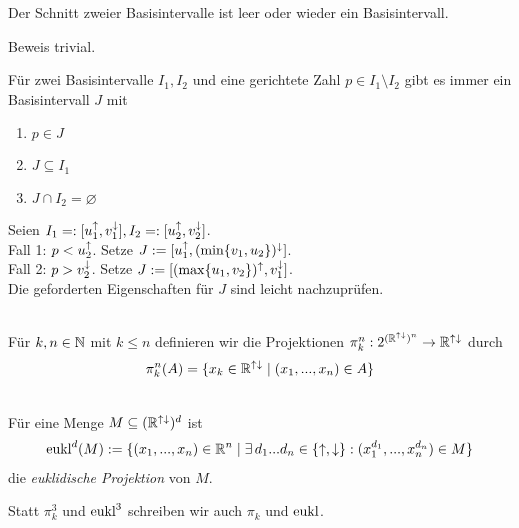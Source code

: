 \begin{satz}
    Der Schnitt zweier Basisintervalle ist leer oder wieder ein Basisintervall.
\end{satz}
Beweis trivial.

\begin{satz}\label{satz:strong-sup-1}
    Für zwei Basisintervalle $I_1, I_2$ und eine gerichtete Zahl $p \in I_1 \setminus I_2$ gibt es immer ein Basisintervall $J$ mit
    \begin{enumerate}
        \item $p \in J$
        \item $J \subseteq I_1$
        \item $J \cap I_2 = \varnothing$
    \end{enumerate}
\end{satz}

\begin{bew}
    Seien $I_1 =: [u_1^{\uparrow}, v_1^{\downarrow}], I_2 =: [u_2^{\uparrow}, v_2^{\downarrow}]$.\\
    Fall 1: $p < u_2^{\uparrow}$. Setze $J := [u_1^{\uparrow} , (\min\{v_1,u_2\})^{\downarrow}]$.\\
    Fall 2: $p > v_2^{\downarrow}$. Setze $J := [(\max\{u_1,v_2\})^{\uparrow}, v_1^{\downarrow}]$.\\
    Die geforderten Eigenschaften für $J$ sind leicht nachzuprüfen.
\end{bew}

\begin{dfn}[Projektionen]\ \\
    Für $k,n \in \mathbb{N}$ mit $k \leq n$ definieren wir die Projektionen $\pi_k^n : 2^{(\mathbb{R}^{{\uparrow \downarrow}})^n} \to \mathbb{R}^{{\uparrow \downarrow}}$ durch
    \begin{align*}
        \pi_k^n (A) = \{x_k \in \mathbb{R}^{{\uparrow \downarrow}} \mid (x_1, ..., x_n) \in A\}
    \end{align*}
\end{dfn}

\begin{dfn}\ \\
    Für eine Menge $M \subseteq (\mathbb{R}^{{\uparrow \downarrow}})^d$ ist
    \begin{align*}
        \text{eukl}^d(M) := \{(x_1,...,x_n) \in \mathbb{R}^n \mid \exists\, d_1 ... d_n \in \{\uparrow, \downarrow\}: (x_1^{d_1}, ..., x_n^{d_n}) \in M\}
    \end{align*}
    die \emph{euklidische Projektion} von $M$.
\end{dfn}

\begin{nota}
    Statt $\pi_k^3$ und $\text{eukl}^3$ schreiben wir auch $\pi_k$ und $\text{eukl}$.
\end{nota}




